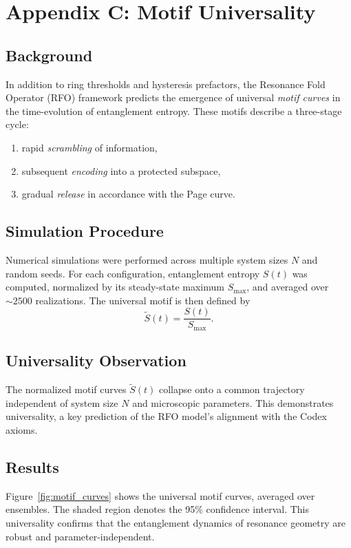 \documentclass[12pt]{article}
\begin{document}
\section*{Appendix C: Motif Universality}

\subsection*{Background}

In addition to ring thresholds and hysteresis prefactors, the Resonance Fold Operator
(RFO) framework predicts the emergence of universal \emph{motif curves} in the
time-evolution of entanglement entropy. These motifs describe a three-stage cycle:
\begin{enumerate}
  \item rapid \emph{scrambling} of information,
  \item subsequent \emph{encoding} into a protected subspace,
  \item gradual \emph{release} in accordance with the Page curve.
\end{enumerate}

\subsection*{Simulation Procedure}

Numerical simulations were performed across multiple system sizes $N$
and random seeds. For each configuration, entanglement entropy
$S(t)$ was computed, normalized by its steady-state maximum $S_{\max}$, and averaged over
$\sim 2500$ realizations. The universal motif is then defined by
\[
\tilde S(t) = \frac{S(t)}{S_{\max}}.
\]

\subsection*{Universality Observation}

The normalized motif curves $\tilde S(t)$ collapse onto a common
trajectory independent of system size $N$ and microscopic parameters.
This demonstrates universality, a key prediction of the RFO model’s
alignment with the Codex axioms.

\subsection*{Results}

Figure~\ref{fig:motif_curves} shows the universal motif curves, averaged
over ensembles. The shaded region denotes the 95\% confidence interval.
This universality confirms that the entanglement dynamics of resonance
geometry are robust and parameter-independent.
\end{document}
